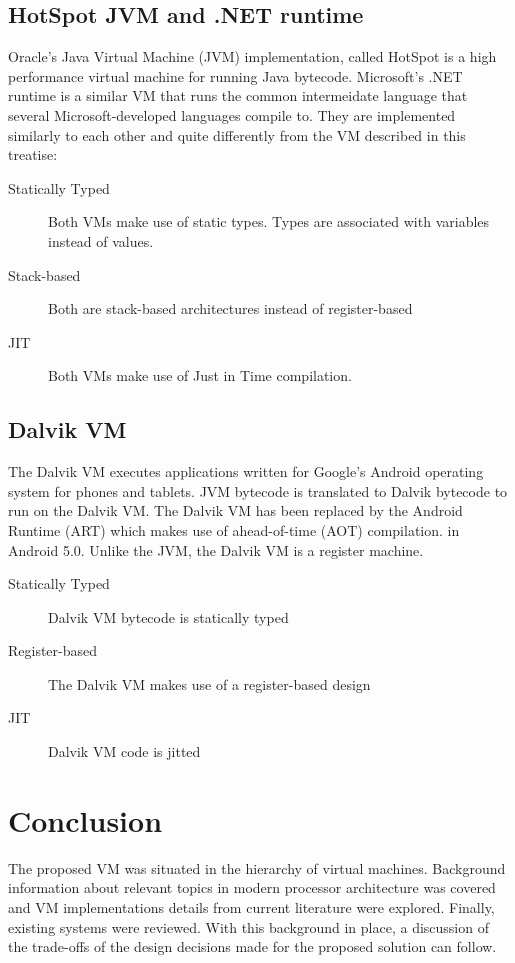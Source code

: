 \documentclass[english,a4paper,12pt]{report}
\begin{document}
\subsection{HotSpot JVM and .NET runtime}
Oracle's Java Virtual Machine (JVM) implementation, called HotSpot is a
high performance virtual machine for running Java
bytecode. Microsoft's .NET runtime is a similar VM that runs the
common intermeidate language that several Microsoft-developed
languages compile to. They are implemented similarly to each other and
quite differently from the VM described in this treatise:
\begin{description}
\item[Statically Typed] Both VMs make use of static types. Types are
  associated with variables instead of values.
\item[Stack-based] Both are stack-based architectures instead of
  register-based
\item[JIT] Both VMs make use of Just in Time compilation.
\end{description}

\subsection{Dalvik VM}
The Dalvik VM executes applications written for Google's Android
operating system for phones and tablets. JVM bytecode is translated to
Dalvik bytecode to run on the Dalvik VM. The Dalvik VM has been
replaced by the Android Runtime (ART) which makes use of ahead-of-time
(AOT) compilation. in Android 5.0. Unlike the JVM, the Dalvik VM is a
register machine.
\begin{description}
\item[Statically Typed] Dalvik VM bytecode is statically typed
\item[Register-based] The Dalvik VM makes use of a register-based
  design
\item[JIT] Dalvik VM code is jitted
\end{description}

\section{Conclusion}
The proposed VM was situated in the hierarchy of virtual
machines. Background information about relevant topics in modern
processor architecture was covered and VM implementations details from
current literature were explored. Finally, existing systems were
reviewed. With this background in place, a discussion of the
trade-offs of the design decisions made for the proposed solution can
follow.
\end{document}
